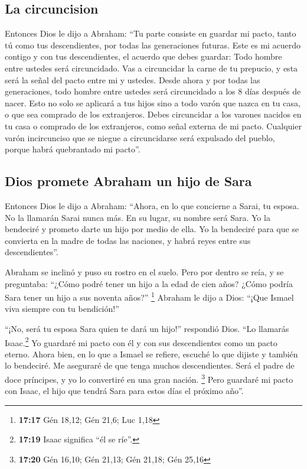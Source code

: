 \hypertarget{la-circuncision}{%
\subsection{La circuncision}\label{la-circuncision}}

 Entonces Dios le dijo a Abraham: ``Tu parte consiste en
guardar mi pacto, tanto tú como tus descendientes, por todas las
generaciones futuras.  Este es mi acuerdo contigo y con
tus descendientes, el acuerdo que debes guardar: Todo hombre entre
ustedes será circuncidado.  Vas a circuncidar la carne de
tu prepucio, y esta será la señal del pacto entre mi y ustedes.
 Desde ahora y por todas las generaciones, todo hombre
entre ustedes será circuncidado a los 8 días después de nacer. Esto no
solo se aplicará a tus hijos sino a todo varón que nazca en tu casa, o
que sea comprado de los extranjeros.  Debes circuncidar a
los varones nacidos en tu casa o comprado de los extranjeros, como señal
externa de mi pacto.  Cualquier varón incircunciso que se
niegue a circuncidarse será expulsado del pueblo, porque habrá
quebrantado mi pacto''.

\hypertarget{dios-promete-abraham-un-hijo-de-sara}{%
\subsection{Dios promete Abraham un hijo de
Sara}\label{dios-promete-abraham-un-hijo-de-sara}}

 Entonces Dios le dijo a Abraham: ``Ahora, en lo que
concierne a Sarai, tu esposa. No la llamarán Sarai nunca más. En su
lugar, su nombre será Sara.  Yo la bendeciré y prometo
darte un hijo por medio de ella. Yo la bendeciré para que se convierta
en la madre de todas las naciones, y habrá reyes entre sus
descendientes''.

 Abraham se inclinó y puso su rostro en el suelo. Pero
por dentro se reía, y se preguntaba: ``¿Cómo podré tener un hijo a la
edad de cien años? ¿Cómo podría Sara tener un hijo a sus noventa años?''
\footnote{\textbf{17:17} Gén 18,12; Gén 21,6; Luc 1,18} 
Abraham le dijo a Dios: ``¡Que Ismael viva siempre con tu bendición!''

 ``¡No, será tu esposa Sara quien te dará un hijo!''
respondió Dios. ``Lo llamarás Isaac.\footnote{\textbf{17:19} Isaac
  significa ``él se ríe''.} Yo guardaré mi pacto con él y con sus
descendientes como un pacto eterno.  Ahora bien, en lo
que a Ismael se refiere, escuché lo que dijiste y también lo bendeciré.
Me aseguraré de que tenga muchos descendientes. Será el padre de doce
príncipes, y yo lo convertiré en una gran nación. \footnote{\textbf{17:20}
  Gén 16,10; Gén 21,13; Gén 21,18; Gén 25,16}  Pero
guardaré mi pacto con Isaac, el hijo que tendrá Sara para estos días el
próximo año''.

